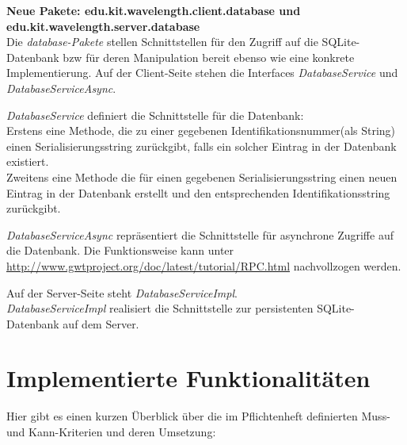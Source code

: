 \documentclass[parskip=full,11pt,twoside]{scrartcl}
\begin{document}
\textbf{Neue Pakete: edu.kit.wavelength.client.database und edu.kit.wavelength.server.database} \\
Die \emph{database-Pakete} stellen Schnittstellen für den Zugriff auf die SQLite-Datenbank bzw für deren Manipulation bereit ebenso wie eine konkrete Implementierung.
Auf der Client-Seite stehen die Interfaces \emph{DatabaseService} und \emph{DatabaseServiceAsync}.

\emph{DatabaseService} definiert die Schnittstelle für die Datenbank: \\
Erstens eine Methode, die zu einer gegebenen Identifikationsnummer(als String) einen Serialisierungsstring zurückgibt,
falls ein solcher Eintrag in der Datenbank existiert. \\
Zweitens eine Methode die für einen gegebenen Serialisierungsstring einen neuen Eintrag in der Datenbank erstellt und den entsprechenden Identifikationsstring zurückgibt.

\emph{DatabaseServiceAsync} repräsentiert die Schnittstelle für asynchrone Zugriffe auf die Datenbank.
Die Funktionsweise kann unter \href{http://www.gwtproject.org/doc/latest/tutorial/RPC.html}{http://www.gwtproject.org/doc/latest/tutorial/RPC.html} nachvollzogen werden.

Auf der Server-Seite steht \emph{DatabaseServiceImpl}.\\
\emph{DatabaseServiceImpl} realisiert die Schnittstelle zur persistenten SQLite-Datenbank auf dem Server.

\section{Implementierte Funktionalitäten}
Hier gibt es einen kurzen Überblick über die im Pflichtenheft definierten Muss- und Kann-Kriterien und deren Umsetzung:
\end{document}

